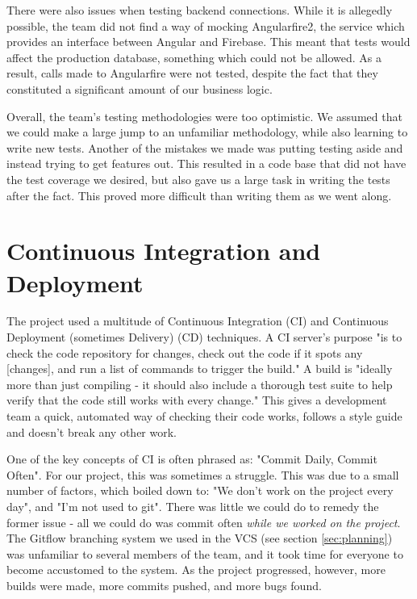 \documentclass{l3proj}
\begin{document}
There were also issues when testing backend connections. While it is
 allegedly possible, the team did not find a way of mocking Angularfire2, the
 service which provides an interface between Angular and Firebase. This meant
 that tests would affect the production database, something which could not be
 allowed. As a result, calls made to Angularfire were not tested, despite the
 fact that they constituted a significant amount of our business logic.

Overall, the team's testing methodologies were too optimistic. We assumed that
 we could make a large jump to an unfamiliar methodology, while also learning
 to write new tests. Another of the mistakes we made was putting testing aside
 and instead trying to get features out. This resulted in a code base that did
 not have the test coverage we desired, but also gave us a large task in writing
 the tests after the fact. This proved more difficult than writing them as we
 went along.

\section{Continuous Integration and Deployment} %
\label{sec:cicd}

The project used a multitude of Continuous Integration (CI) and Continuous
 Deployment (sometimes Delivery) (CD) techniques. A CI server's purpose "is to check the code
 repository for changes, check out the code if it spots any [changes], and run a
 list of commands to trigger the build."\cite{meyer2014continuous} A build is "ideally more than just
 compiling - it should also include a thorough test suite to help verify that the code
 still works with every change."\cite{meyer2014continuous} This gives a development
 team a quick, automated way of checking their code works, follows a style guide and
 doesn't break any other work.

One of the key concepts of CI is often phrased as: "Commit Daily,
 Commit Often"\cite{meyer2014continuous}. For our project, this was sometimes a struggle.
 This was due to a small number of factors, which boiled down to: "We don't work on the project
 every day", and "I'm not used to git". There was little we could do to remedy the former issue -
 all we could do was commit often \textit{while we worked on the project}. The Gitflow
 branching system we used in the VCS (see section \ref{sec:planning}) was unfamiliar to several
 members of the team, and it took time for everyone to become accustomed to the system. As the
 project progressed, however, more builds were made, more commits pushed, and more bugs found.
\end{document}
